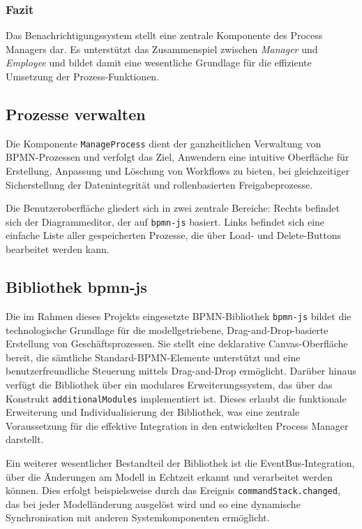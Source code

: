 \subsubsection*{Fazit}

Das Benachrichtigungssystem stellt eine zentrale Komponente des Process Managers dar. Es unterstützt das Zusammenspiel zwischen \textit{Manager} und \textit{Employee} und bildet damit eine wesentliche Grundlage für die effiziente Umsetzung der Prozess-Funktionen.

\newpage
\subsection{Prozesse verwalten} \label{Manage_Process}
Die Komponente \texttt{ManageProcess} dient der ganzheitlichen Verwaltung von BPMN-Prozessen und verfolgt das Ziel, Anwendern eine intuitive Oberfläche für Erstellung, Anpassung und Löschung von Workflows zu bieten, bei gleichzeitiger Sicherstellung der Datenintegrität und rollenbasierten Freigabeprozesse.

Die Benutzeroberfläche gliedert sich in zwei zentrale Bereiche: Rechts befindet sich der Diagrammeditor, der auf \texttt{bpmn-js} basiert. Links befindet sich eine einfache Liste aller gespeicherten Prozesse, die über Load- und Delete-Buttons bearbeitet werden kann.

\subsection*{Bibliothek bpmn-js}
Die im Rahmen dieses Projekts eingesetzte BPMN-Bibliothek \texttt{bpmn-js} bildet die technologische Grundlage für die modellgetriebene, Drag-and-Drop-basierte Erstellung von Geschäftsprozessen. Sie stellt eine deklarative Canvas-Oberfläche bereit, die sämtliche Standard-BPMN-Elemente unterstützt und eine benutzerfreundliche Steuerung mittels Drag-and-Drop ermöglicht. Darüber hinaus verfügt die Bibliothek über ein modulares Erweiterungssystem, das über das Konstrukt \texttt{additionalModules} implementiert ist. Dieses erlaubt die funktionale Erweiterung und Individualisierung der Bibliothek, was eine zentrale Voraussetzung für die effektive Integration in den entwickelten Process Manager darstellt.

Ein weiterer wesentlicher Bestandteil der Bibliothek ist die EventBus-Integration, über die Änderungen am Modell in Echtzeit erkannt und verarbeitet werden können. Dies erfolgt beispielsweise durch das Ereignis \texttt{commandStack.changed}, das bei jeder Modelländerung ausgelöst wird und so eine dynamische Synchronisation mit anderen Systemkomponenten ermöglicht.

